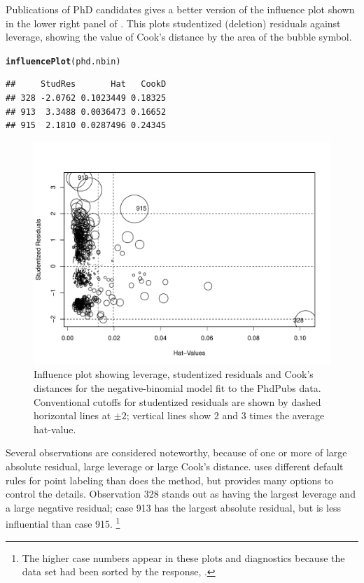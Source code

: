 \documentclass[11pt]{book}\usepackage[]{graphicx}\usepackage[]{color}
\makeatletter
\newcommand{\hlstd}[1]{\textcolor[rgb]{0.345,0.345,0.345}{#1}}%
\newcommand{\hlkwd}[1]{\textcolor[rgb]{0.737,0.353,0.396}{\textbf{#1}}}%
\newenvironment{kframe}{%
 \def\at@end@of@kframe{}%
 \ifinner\ifhmode%
  \def\at@end@of@kframe{\end{minipage}}%
  \begin{minipage}{\columnwidth}%
 \fi\fi%
 \def\FrameCommand##1{\hskip\@totalleftmargin \hskip-\fboxsep
 \colorbox{shadecolor}{##1}\hskip-\fboxsep
     \hskip-\linewidth \hskip-\@totalleftmargin \hskip\columnwidth}%
 \MakeFramed {\advance\hsize-\width
   \@totalleftmargin\z@ \linewidth\hsize
   \@setminipage}}%
 {\par\unskip\endMakeFramed%
 \at@end@of@kframe}
\newenvironment{knitrout}{}{} %
\renewenvironment{knitrout}{\small\renewcommand{\baselinestretch}{.85}}{} %
\makeatother
\begin{document}
\begin{Example}[phdpubs5]{Publications of PhD candidates}
 gives a better version of the influence plot shown in the lower right
panel of .
This plots studentized (deletion) residuals against leverage, showing
the value of Cook's distance by the area of the bubble symbol.
\begin{knitrout}
\color{fgcolor}\begin{kframe}
\begin{alltt}
\hlkwd{influencePlot}\hlstd{(phd.nbin)}
\end{alltt}
\begin{verbatim}
##     StudRes       Hat   CookD
## 328 -2.0762 0.1023449 0.18325
## 913  3.3488 0.0036473 0.16652
## 915  2.1810 0.0287496 0.24345
\end{verbatim}
\end{kframe}\begin{figure}[!htbp]


\centerline{\includegraphics[width=.7\textwidth]{ch09/fig/phdpubs5-influenceplot-1} }

\caption[Influence plot showing leverage, studentized residuals and Cook's distances for the negative-binomial model fit to the PhdPubs data]{Influence plot showing leverage, studentized residuals and Cook's distances for the negative-binomial model fit to the PhdPubs data. Conventional cutoffs for studentized residuals are shown by dashed horizontal lines at $\pm 2$; vertical lines show 2 and 3 times the average hat-value.\label{fig:phdpubs5-influenceplot}}
\end{figure}


\end{knitrout}
Several observations are considered noteworthy, because of one or more of large absolute residual, large leverage or
large Cook's distance.  uses different default rules for point labeling than does the
 method, but provides many options to control the details.
Observation 328 stands out as having the largest leverage and a large negative residual;
case 913 has the largest absolute residual, but is less influential than case 915.%
\footnote{
The higher case numbers appear in these plots and diagnostics because the data set  had been sorted
by the response, .
}


\end{Example}
\end{document}
